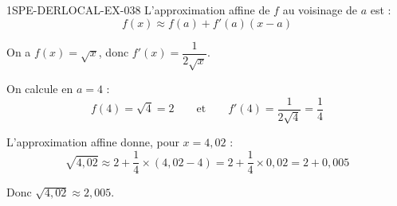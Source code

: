\begin{corrige}{1SPE-DERLOCAL-EX-038}
L'approximation affine de $f$ au voisinage de $a$ est :
\[
f(x) \approx f(a) + f'(a)(x - a)
\]

On a $f(x) = \sqrt{x}$, donc $f'(x) = \dfrac{1}{2\sqrt{x}}$.

On calcule en $a = 4$ :
\[
f(4) = \sqrt{4} = 2 \qquad \text{et} \qquad f'(4) = \frac{1}{2\sqrt{4}} = \frac{1}{4}
\]

L'approximation affine donne, pour $x = 4{,}02$ :
\[
\sqrt{4{,}02} \approx 2 + \frac{1}{4} \times (4{,}02 - 4) = 2 + \frac{1}{4} \times 0{,}02 = 2 + 0{,}005
\]

Donc $\boxed{\sqrt{4{,}02} \approx 2{,}005}$.
\end{corrige}
